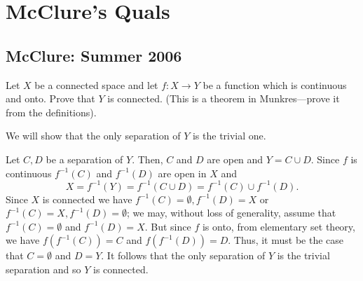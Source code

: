 \section{McClure's Quals}
\subsection{McClure: Summer 2006}
\setcounter{exercise}{0}
\setcounter{equation}{0}

\begin{problem}
  Let \(X\) be a connected space and let \(f\colon X\to Y\) be a function
  which is continuous and onto. Prove that \(Y\) is connected. (This is a
  theorem in Munkres---prove it from the definitions).
\end{problem}
\begin{solution}
  We will show that the only separation of \(Y\) is the trivial one.

  Let \(C,D\) be a separation of \(Y\). Then, \(C\) and \(D\) are open and
  \(Y=C\cup D\). Since \(f\) is continuous \(f^{-1}(C)\) and \(f^{-1}(D)\)
  are open in \(X\) and
  \[
    X=f^{-1}(Y)=f^{-1}(C\cup D)=f^{-1}(C)\cup f^{-1}(D).
  \]
  Since \(X\) is connected we have \(f^{-1}(C)=\emptyset,f^{-1}(D)=X\) or
  \(f^{-1}(C)=X,f^{-1}(D)=\emptyset\); we may, without loss of generality,
  assume that \(f^{-1}(C)=\emptyset\) and \(f^{-1}(D)=X\). But since \(f\)
  is onto, from elementary set theory, we have \(f(f^{-1}(C))=C\) and
  \(f(f^{-1}(D))=D\). Thus, it must be the case that \(C=\emptyset\) and
  \(D=Y\). It follows that the only separation of \(Y\) is the trivial
  separation and so \(Y\) is connected.
\end{solution}

